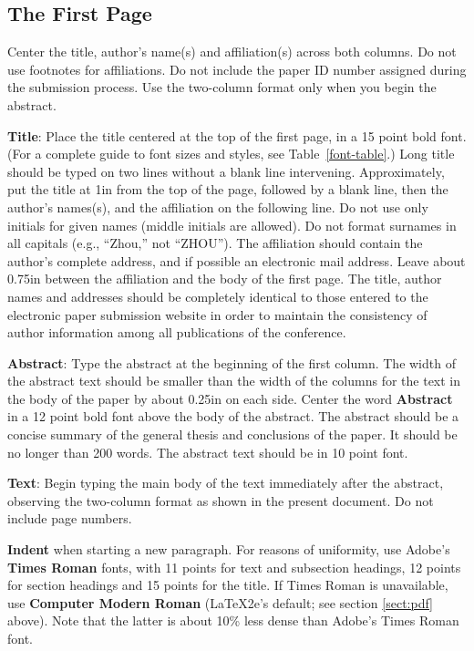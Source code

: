 \documentclass[11pt]{article}
\begin{document}
\subsection{The First Page}
\label{ssec:first}

Center the title, author's name(s) and affiliation(s) across both
columns. Do not use footnotes for affiliations.  Do not include the
paper ID number assigned during the submission process.
Use the two-column format only when you begin the abstract.

{\bf Title}: Place the title centered at the top of the first page, in
a 15 point bold font.  (For a complete guide to font sizes and styles, see Table~\ref{font-table}.)
Long title should be typed on two lines without
a blank line intervening. Approximately, put the title at 1in from the
top of the page, followed by a blank line, then the author's names(s),
and the affiliation on the following line.  Do not use only initials
for given names (middle initials are allowed). Do not format surnames
in all capitals (e.g., ``Zhou,'' not ``ZHOU'').  The affiliation should
contain the author's complete address, and if possible an electronic
mail address. Leave about 0.75in between the affiliation and the body
of the first page. The title, author names and addresses should be completely identical to those entered to the electronic paper submission website in order to maintain the consistency of author information among all publications of the conference.

{\bf Abstract}: Type the abstract at the beginning of the first
column.  The width of the abstract text should be smaller than the
width of the columns for the text in the body of the paper by about
0.25in on each side.  Center the word {\bf Abstract} in a 12 point
bold font above the body of the abstract. The abstract should be a
concise summary of the general thesis and conclusions of the paper.
It should be no longer than 200 words. The abstract text should be in 10 point font.

{\bf Text}: Begin typing the main body of the text immediately after
the abstract, observing the two-column format as shown in
the present document. Do not include page numbers.

{\bf Indent} when starting a new paragraph. For reasons of uniformity,
use Adobe's {\bf Times Roman} fonts, with 11 points for text and
subsection headings, 12 points for section headings and 15 points for
the title.  If Times Roman is unavailable, use {\bf Computer Modern
  Roman} (\LaTeX2e's default; see section \ref{sect:pdf} above).
Note that the latter is about 10\% less dense than Adobe's Times Roman
font.
\end{document}
